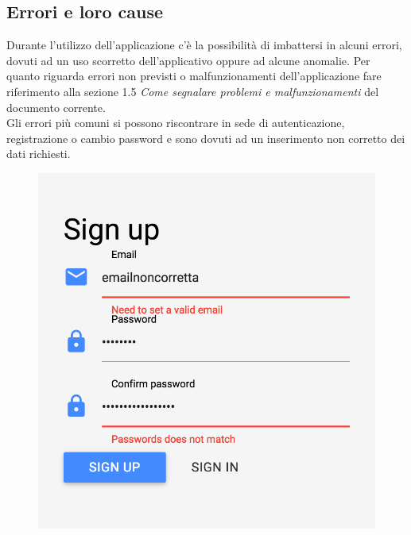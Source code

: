 \subsection{Errori e loro cause}
Durante l'utilizzo dell'applicazione c'è la possibilità di imbattersi in alcuni errori, dovuti ad un uso scorretto dell'applicativo oppure ad alcune anomalie. Per quanto riguarda errori non previsti o malfunzionamenti dell'applicazione fare riferimento alla sezione 1.5 \emph{Come segnalare problemi e malfunzionamenti} del documento corrente.\\

Gli errori più comuni si possono riscontrare in sede di autenticazione, registrazione o cambio password e sono dovuti ad un inserimento non corretto dei dati richiesti.

\begin{figure}[!h]
\begin{center}
\includegraphics[scale=0.4]{img/signup_error.png}%
\qquad\qquad

\end{center}
\end{figure}
